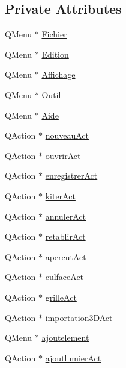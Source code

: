 \subsection*{Private Attributes}
\begin{DoxyCompactItemize}
\item 
Q\+Menu $\ast$ \hyperlink{class_main_window_ac5ad5607ac4e015f5b594aa73ca6703a}{Fichier}
\item 
Q\+Menu $\ast$ \hyperlink{class_main_window_af32c5a214657e6a6dd30269f81c8b450}{Edition}
\item 
Q\+Menu $\ast$ \hyperlink{class_main_window_a77f24d5ff1220ea72f7730d20672911c}{Affichage}
\item 
Q\+Menu $\ast$ \hyperlink{class_main_window_a8763d8624da754aef58d119d70462e60}{Outil}
\item 
Q\+Menu $\ast$ \hyperlink{class_main_window_ab9d17ad44a1ac962e46ac4af1a5732a0}{Aide}
\item 
Q\+Action $\ast$ \hyperlink{class_main_window_a193a37a0da1d22c48c64af3f6c5a6c51}{nouveau\+Act}
\item 
Q\+Action $\ast$ \hyperlink{class_main_window_ac02355cedb6a7337d9ee55d91dd9a4c0}{ouvrir\+Act}
\item 
Q\+Action $\ast$ \hyperlink{class_main_window_aaf23ba5444a4264c5c53fec9b729b2ba}{enregistrer\+Act}
\item 
Q\+Action $\ast$ \hyperlink{class_main_window_ac1517849e119e00fbbebe90570eabade}{kiter\+Act}
\item 
Q\+Action $\ast$ \hyperlink{class_main_window_ace04c15ff28b4931c15f823d0d2ed23b}{annuler\+Act}
\item 
Q\+Action $\ast$ \hyperlink{class_main_window_ab36e19495a8fe7e099772ea3ba4669c1}{retablir\+Act}
\item 
Q\+Action $\ast$ \hyperlink{class_main_window_a26d7fbeaa5d928206325ccccc9ed82c9}{apercut\+Act}
\item 
Q\+Action $\ast$ \hyperlink{class_main_window_acc241f6a81ac7e252fac333e8e725da3}{culface\+Act}
\item 
Q\+Action $\ast$ \hyperlink{class_main_window_a28c1cca30ba2fe676455f847c6f4a60a}{grille\+Act}
\item 
Q\+Action $\ast$ \hyperlink{class_main_window_a5c1ee7709fa8c1f29d7df9ee04b74ab8}{importation3\+D\+Act}
\item 
Q\+Menu $\ast$ \hyperlink{class_main_window_a6c2ded3bdffc863604d7890c554578d5}{ajoutelement}
\item 
Q\+Action $\ast$ \hyperlink{class_main_window_a04b22ecfd14e02f1dd5a5dd77b509f8e}{ajoutlumier\+Act}

\end{DoxyCompactItemize}
